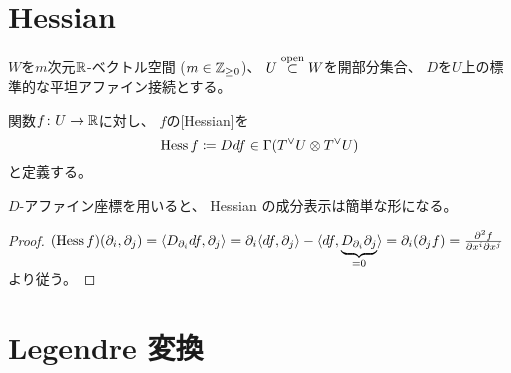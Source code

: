 \documentclass[report]{jlreq}
\begin{document}
%
\section{Hessian}

$W$を$m$次元$\mathbb{R}$-ベクトル空間 ($m \in \mathbb{Z}_{\ge 0}$)、
$U \stackrel{\text{open}}{\subset} W$を開部分集合、
$D$を$U$上の標準的な平坦アファイン接続とする。

\begin{definition}[Hessian]
    \smooth 関数$f \colon U \to \mathbb{R}$に対し、
    $f$の[Hessian]を
    \begin{equation}
        \operatorname{Hess} f \coloneqq Ddf
            \in \Gamma(T^\vee U \otimes T^\vee U)
    \end{equation}
    と定義する。
\end{definition}

$D$-アファイン座標を用いると、
Hessian の成分表示は簡単な形になる。


\begin{proof}
    $(\operatorname{Hess} f)(\partial_i, \partial_j)
        = \langle D_{\partial_i} df, \partial_j \rangle
        = \partial_i \langle df, \partial_j \rangle
            - \langle
                df,
                \underbrace{D_{\partial_i} \partial_j}_{= 0}
            \rangle
        = \partial_i (\partial_j f)
        = \frac{\partial^2 f}{\partial x^i \partial x^j}$
    より従う。
\end{proof}

\begin{proposition}
\end{proposition}

%
\section{Legendre 変換}
\end{document}
